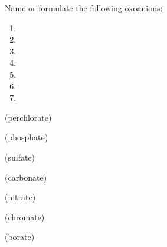 \documentclass[main.tex]{subfiles}
\begin{document}
\begin{multicols*}{2}
\begin{question}[ID=\the\value{numA}]
Name or formulate the following oxoanions:
 \begin{multicols}{2}
 \noindent
  \begin{enumerate} [topsep=0pt, partopsep=0pt, label=(\alph*), leftmargin=.4cm]
\item  {} %
\item  {} %
\item  {} %
\item  {} %
\item  {} %
\item  {} %
\item  {} %
\end{enumerate}
\end{multicols}
\end{question}
\begin{solution}
\begin{inparaenum}[(a)]
 \item  {}  (perchlorate)
\item  {}  (phosphate)
\item  {}  (sulfate)
\item  {}  (carbonate)
\item  {}  (nitrate)
\item  {} (chromate)
\item  {}  (borate)
\end{inparaenum}\hspace{0.1cm}\end{solution}



\end{multicols*}
\end{document}
